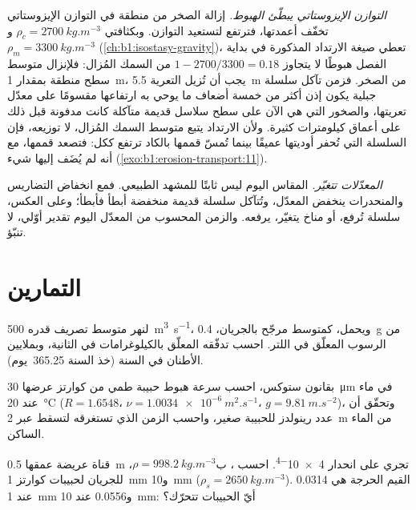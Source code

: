 \emph{التوازن الإيزوستاتي يبطّئ الهبوط.} إزالة الصخر من منطقة في التوازن الإيزوستاتي تخفّف أعمدتها، فترتفع  لتستعيد التوازن. وبكثافتي $\rho_c
= \qty{2700}{kg.m^{-3}}$ و$\rho_m = \qty{3300}{kg.m^{-3}}$ (\cref{ch:b1:isostasy-gravity})، تعطي صيغة الارتداد المذكورة في بداية الفصل هبوطًا لا يتجاوز $1 - 2700/3300 = 0.18$ من السمك المُزال: فلإنزال متوسط سطح منطقة بمقدار \qty{1}{m}، يجب أن تُزيل التعرية \qty{5.5}{m} من الصخر. فزمن تآكل سلسلة جبلية يكون إذن أكثر من خمسة أضعاف ما يوحي به ارتفاعها مقسومًا على معدّل تعريتها، والصخور التي هي الآن على سطح سلاسل قديمة متآكلة كانت مدفونة قبل ذلك على أعماق كيلومترات كثيرة. ولأن الارتداد يتبع متوسط السمك المُزال، لا توزيعه، فإن السلسلة التي تُحفر أوديتها عميقًا بينما تُمسّ قممها بالكاد ترتفع ككل: فتصعد قممها، مع أنه لم يُضَف إليها شيء (\cref{exo:b1:erosion-transport:11}).

\emph{المعدّلات تتغيّر.}  المقاس اليوم ليس ثابتًا للمشهد الطبيعي. فمع انخفاض التضاريس والمنحدرات ينخفض المعدّل، وتُتآكل سلسلة قديمة منخفضة أبطأ فأبطأ؛ وعلى العكس، سلسلة تُرفع، أو مناخ يتغيّر، يرفعه. والزمن المحسوب من المعدّل اليوم تقدير أوّلي، لا تنبّؤ.

\section{التمارين}

\begin{exercise}[$\star$]\label{exo:b1:erosion-transport:1}
لنهر متوسط تصريف قدره \qty{500}{m^3.s^{-1}}، ويحمل، كمتوسط مرجّح بالجريان، \qty{0.4}{g} من الرسوب المعلّق في اللتر. احسب تدفّقه المعلّق بالكيلوغرامات في الثانية، وبملايين الأطنان في السنة (خذ السنة \num{365.25}~يوم).
\end{exercise}

\begin{exercise}[$\star$]\label{exo:b1:erosion-transport:2}
بقانون ستوكس، احسب سرعة هبوط حبيبة طمي من كوارتز عرضها \qty{30}{\micro m} في ماء عند \qty{20}{\celsius} ($R = 1.6548$، $\nu =
\qty{1.0034e-6}{m^2.s^{-1}}$، $g = \qty{9.81}{m.s^{-2}}$)، وتحقّق أن عدد رينولدز للحبيبة صغير، واحسب الزمن الذي تستغرقه لتسقط عبر \qty{2}{m} من الماء الساكن.
\end{exercise}

\begin{exercise}[$\star$]\label{exo:b1:erosion-transport:3}
قناة عريضة عمقها \qty{0.5}{m} تجري على انحدار \num{4e-4}. احسب ، ب$\rho = \qty{998.2}{kg.m^{-3}}$،  للجريان لحبيبات كوارتز \qty{1}{mm} و\qty{10}{mm} ($\rho_s = \qty{2650}{kg.m^{-3}}$). القيم الحرجة هي \num{0.0314} عند \qty{1}{mm} و\num{0.0556} عند \qty{10}{mm}: أيّ الحبيبات تتحرّك؟
\end{exercise}

